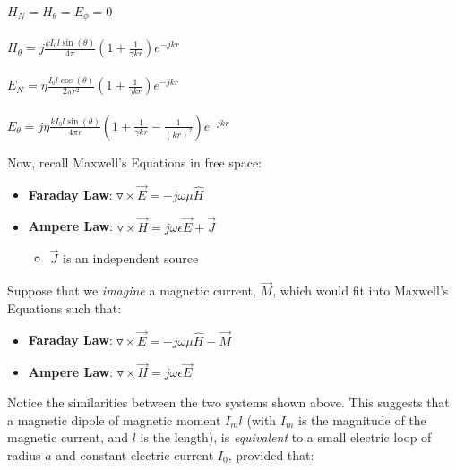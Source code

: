\documentclass{article}
\begin{document}
\begin{center}
    
    $H_N = H_\theta = E_\phi = 0$ \\
    \hspace{0.1} \\
    $H_\theta = j \frac{k I_0 l \sin(\theta)}{4\pi} (1 + \frac{1}{\gamma k r}) e^{-j k r}$ \\
    \hspace{0.1} \\
    $E_N = \eta \frac{ I_0 l \cos(\theta)}{2 \pi r^2} (1 + \frac{1}{\gamma k r}) e^{-j k r}$ \\
    \hspace{0.1} \\ 
    $E_\theta = j \eta \frac{k I_0 l \sin(\theta)}{4\pi r} (1 + \frac{1}{\gamma k r} - \frac{1}{(kr)^2}) e^{-j k r} $ \\

\end{center}

Now, recall Maxwell's Equations in free space:

\begin{itemize}
    \item \textbf{Faraday Law}: $\triangledown \times \Vec{E} = -j\omega \mu \hat{H}$
    \item \textbf{Ampere Law}: $\triangledown \times \Vec{H} = j \omega \epsilon \Vec{E} + \Vec{J}$
    \begin{itemize}
        \item $\Vec{J}$ is an independent source
    \end{itemize}
\end{itemize}

Suppose that we \textit{imagine} a magnetic current, $\Vec{M}$, which would fit into Maxwell's Equations such that:

\begin{itemize}
    \item \textbf{Faraday Law}: $\triangledown \times \Vec{E} = -j\omega \mu \hat{H} - \Vec{M}$
    \item \textbf{Ampere Law}: $\triangledown \times \Vec{H} = j \omega \epsilon \Vec{E}$

\end{itemize}

Notice the similarities between the two systems shown above.  This suggests that a magnetic dipole of magnetic moment $I_m l$ (with $I_m$ is the magnitude of the magnetic current, and $l$ is the length), is \textit{equivalent} to a small electric loop of radius $a$ and constant electric current $I_0$, provided that:
\end{document}
